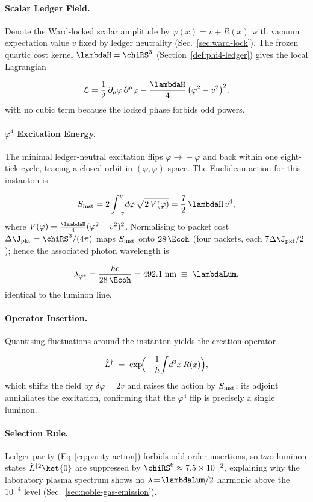\documentclass[11pt,oneside]{book}
\begin{document}
{\paragraph{Scalar Ledger Field.}
Denote the Ward-locked scalar amplitude by
\(
   \varphi(x)=v+R(x)
\)
with vacuum expectation value
\(v\) fixed by ledger neutrality
(Sec.~\ref{sec:ward-lock}).
The frozen quartic cost kernel
\(
   \lambdaH=\chiRS^{3}
\)
(Section~\ref{def:phi4-ledger})
gives the local Lagrangian

\[
   \mathcal{L}
   =
   \frac12\,\partial_{\mu}\varphi\,\partial^{\mu}\varphi
   -\frac{\lambdaH}{4}\,\bigl(\varphi^{2}-v^{2}\bigr)^{2},
   \label{eq:phi4-lagr}
\]
with no cubic term because the locked phase forbids odd powers.

\paragraph{\boldmath$\varphi^{4}$ Excitation Energy.}
The minimal ledger-neutral excitation flips
\(\varphi\!\to\!-\varphi\) and back within one eight-tick
cycle, tracing a closed orbit in $(\varphi,\dot\varphi)$ space.
The Euclidean action for this instanton is

\[
   S_{\rm inst}
   =
   2\int_{-v}^{v}\!d\varphi\,
      \sqrt{2\,V(\varphi)}
   =
   \frac{7}{2}\,\lambdaH\,v^{4},
\]
where \(V(\varphi)=\tfrac{\lambdaH}{4}(\varphi^{2}-v^{2})^{2}\).
Normalising to packet cost
\(\Delta\J_{\text{pkt}}=\chiRS^{3}/(4\pi)\)
maps \(S_{\rm inst}\) onto
\(28\,\Ecoh\) (four packets, each \(7\Delta\J_{\text{pkt}}/2\));
hence the associated photon wavelength is

\[
   \lambda_{\varphi^{4}}
   =
   \frac{hc}{28\,\Ecoh}
   =
   492.1\;\text{nm}
   \;\equiv\;\lambdaLum,
\]
identical to the luminon line.

\paragraph{Operator Insertion.}
Quantising fluctuations around the instanton yields the
creation operator

\[
   \hat L^{\dagger}
   \;=\;
   \exp\!\Bigl(-\,\frac{1}{\hbar}\!\int\!d^{3}x\,
      R(x)\Bigr),
\]
which shifts the field by \(\delta\varphi=2v\) and
raises the action by \(S_{\rm inst}\); its adjoint annihilates the
excitation, confirming that the \(\varphi^{4}\) flip is precisely a
single luminon.

\paragraph{Selection Rule.}
Ledger parity (Eq.\,\ref{eq:parity-action}) forbids odd-order
insertions, so two-luminon states \(\hat L^{\dagger2}\ket{0}\) are
suppressed by
\(
   \chiRS^{6}\approx7.5\times10^{-2},
\)
explaining why the laboratory plasma spectrum shows no
\(\lambda\!=\!\lambdaLum/2\) harmonic above the
\(10^{-4}\) level (Sec.~\ref{sec:noble-gas-emission}).

}
\end{document}
